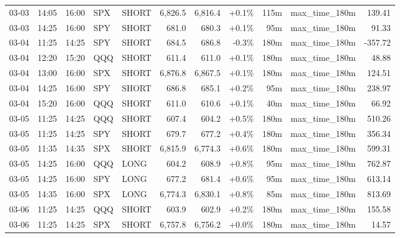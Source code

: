 \documentclass[11pt,a4paper,twoside]{article}
\begin{document}
\begin{center}
\begin{longtable}{>{\color{txtmain}}l l l l l r r r r >{\color{txtmain}}l r}
03-03 & 14:05 & 16:00 & SPX & SHORT & 6,826.5 & 6,816.4 & \textcolor{wingreen}{+0.1\%} & 115m & max\_time\_180m & \textcolor{wingreen}{139.41} \\
03-03 & 14:25 & 16:00 & SPY & SHORT & 681.0 & 680.3 & \textcolor{wingreen}{+0.1\%} & 95m & max\_time\_180m & \textcolor{wingreen}{91.33} \\
03-04 & 11:25 & 14:25 & SPY & SHORT & 684.5 & 686.8 & \textcolor{lossred}{-0.3\%} & 180m & max\_time\_180m & \textcolor{lossred}{-357.72} \\
03-04 & 12:20 & 15:20 & QQQ & SHORT & 611.4 & 611.0 & \textcolor{wingreen}{+0.1\%} & 180m & max\_time\_180m & \textcolor{wingreen}{48.88} \\
03-04 & 13:00 & 16:00 & SPX & SHORT & 6,876.8 & 6,867.5 & \textcolor{wingreen}{+0.1\%} & 180m & max\_time\_180m & \textcolor{wingreen}{124.51} \\
03-04 & 14:25 & 16:00 & SPY & SHORT & 686.8 & 685.1 & \textcolor{wingreen}{+0.2\%} & 95m & max\_time\_180m & \textcolor{wingreen}{238.97} \\
03-04 & 15:20 & 16:00 & QQQ & SHORT & 611.0 & 610.6 & \textcolor{wingreen}{+0.1\%} & 40m & max\_time\_180m & \textcolor{wingreen}{66.92} \\
03-05 & 11:25 & 14:25 & QQQ & SHORT & 607.4 & 604.2 & \textcolor{wingreen}{+0.5\%} & 180m & max\_time\_180m & \textcolor{wingreen}{510.26} \\
03-05 & 11:25 & 14:25 & SPY & SHORT & 679.7 & 677.2 & \textcolor{wingreen}{+0.4\%} & 180m & max\_time\_180m & \textcolor{wingreen}{356.34} \\
03-05 & 11:35 & 14:35 & SPX & SHORT & 6,815.9 & 6,774.3 & \textcolor{wingreen}{+0.6\%} & 180m & max\_time\_180m & \textcolor{wingreen}{599.31} \\
03-05 & 14:25 & 16:00 & QQQ & LONG & 604.2 & 608.9 & \textcolor{wingreen}{+0.8\%} & 95m & max\_time\_180m & \textcolor{wingreen}{762.87} \\
03-05 & 14:25 & 16:00 & SPY & LONG & 677.2 & 681.4 & \textcolor{wingreen}{+0.6\%} & 95m & max\_time\_180m & \textcolor{wingreen}{613.14} \\
03-05 & 14:35 & 16:00 & SPX & LONG & 6,774.3 & 6,830.1 & \textcolor{wingreen}{+0.8\%} & 85m & max\_time\_180m & \textcolor{wingreen}{813.69} \\
03-06 & 11:25 & 14:25 & QQQ & SHORT & 603.9 & 602.9 & \textcolor{wingreen}{+0.2\%} & 180m & max\_time\_180m & \textcolor{wingreen}{155.58} \\
03-06 & 11:25 & 14:25 & SPX & SHORT & 6,757.8 & 6,756.2 & \textcolor{wingreen}{+0.0\%} & 180m & max\_time\_180m & \textcolor{wingreen}{14.57} \\

\end{longtable}
\end{center}
\end{document}
